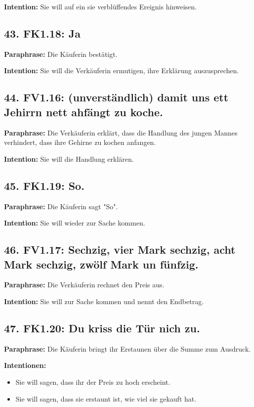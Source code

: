 \documentclass[11pt]{article}
\begin{document}
\textbf{Intention:} Sie will auf ein sie verblüffendes Ereignis hinweisen.

\subsection*{43. FK1.18: Ja}

\textbf{Paraphrase:} Die Käuferin bestätigt.

\textbf{Intention:} Sie will die Verkäuferin ermutigen, ihre Erklärung auszusprechen.

\subsection*{44. FV1.16: (unverständlich) damit uns ett Jehirrn nett ahfängt zu koche.}

\textbf{Paraphrase:} Die Verkäuferin erklärt, dass die Handlung des jungen Mannes verhindert, dass ihre Gehirne zu kochen anfangen.

\textbf{Intention:} Sie will die Handlung erklären.

\subsection*{45. FK1.19: So.}

\textbf{Paraphrase:} Die Käuferin sagt "So".

\textbf{Intention:} Sie will wieder zur Sache kommen.

\subsection*{46. FV1.17: Sechzig, vier Mark sechzig, acht Mark sechzig, zwölf Mark un fünfzig.}

\textbf{Paraphrase:} Die Verkäuferin rechnet den Preis aus.

\textbf{Intention:} Sie will zur Sache kommen und nennt den Endbetrag.

\subsection*{47. FK1.20: Du kriss die Tür nich zu.}

\textbf{Paraphrase:} Die Käuferin bringt ihr Erstaunen über die Summe zum Ausdruck.

\textbf{Intentionen:}
\begin{itemize}
    \item Sie will sagen, dass ihr der Preis zu hoch erscheint.
    \item Sie will sagen, dass sie erstaunt ist, wie viel sie gekauft hat.
\end{itemize}
\end{document}
